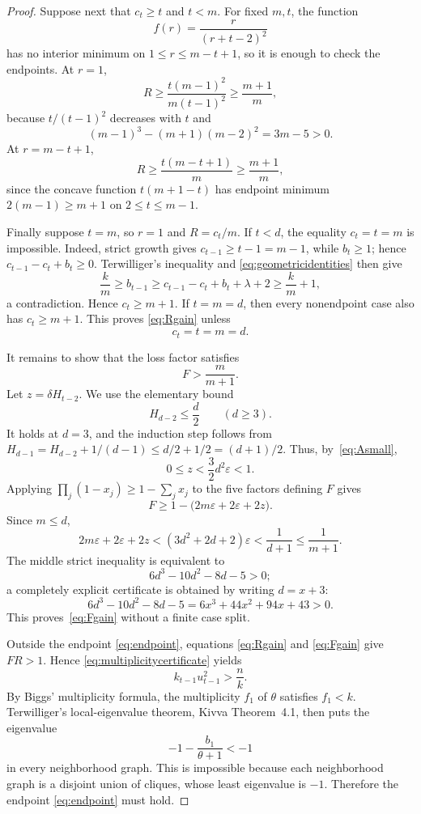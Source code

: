 \documentclass[11pt]{amsart}
\theoremstyle{definition}
\newcommand{\eps}{\varepsilon}
\begin{document}
\begin{proof}
Suppose next that $c_t\ge t$ and $t<m$.  For fixed $m,t$, the function
\[
  f(r)=\frac{r}{(r+t-2)^2}
\]
has no interior minimum on $1\le r\le m-t+1$, so it is enough to check the endpoints.  At $r=1$,
\[
  R\ge\frac{t(m-1)^2}{m(t-1)^2}\ge\frac{m+1}{m},
\]
because $t/(t-1)^2$ decreases with $t$ and
\[
  (m-1)^3-(m+1)(m-2)^2=3m-5>0.
\]
At $r=m-t+1$,
\[
  R\ge\frac{t(m-t+1)}{m}\ge\frac{m+1}{m},
\]
since the concave function $t(m+1-t)$ has endpoint minimum $2(m-1)\ge m+1$ on $2\le t\le m-1$.

Finally suppose $t=m$, so $r=1$ and $R=c_t/m$.  If $t<d$, the equality $c_t=t=m$ is impossible.  Indeed, strict growth gives $c_{t-1}\ge t-1=m-1$, while $b_t\ge1$; hence $c_{t-1}-c_t+b_t\ge0$.  Terwilliger's inequality and \eqref{eq:geometricidentities} then give
\[
  \frac{k}{m}\ge b_{t-1}
  \ge c_{t-1}-c_t+b_t+\lambda+2
  \ge\frac{k}{m}+1,
\]
a contradiction.  Hence $c_t\ge m+1$.  If $t=m=d$, then every nonendpoint case also has $c_t\ge m+1$.  This proves \eqref{eq:Rgain} unless
\begin{equation}\label{eq:endpoint}
  c_t=t=m=d.
\end{equation}

It remains to show that the loss factor satisfies
\begin{equation}\label{eq:Fgain}
  F>\frac{m}{m+1}.
\end{equation}
Let $z=\delta H_{t-2}$.  We use the elementary bound
\begin{equation}\label{eq:harmoniclinear}
  H_{d-2}\le\frac d2\qquad(d\ge3).
\end{equation}
It holds at $d=3$, and the induction step follows from
$H_{d-1}=H_{d-2}+1/(d-1)\le d/2+1/2=(d+1)/2$.
Thus, by~\eqref{eq:Asmall},
\[
  0\le z<\frac32d^2\eps<1.
\]
Applying $\prod_j(1-x_j)\ge1-\sum_jx_j$ to the five factors defining $F$ gives
\[
  F\ge1-\bigl(2m\eps+2\eps+2z\bigr).
\]
Since $m\le d$,
\[
  2m\eps+2\eps+2z
  <(3d^2+2d+2)\eps
  <\frac1{d+1}
  \le\frac1{m+1}.
\]
The middle strict inequality is equivalent to
\[
  6d^3-10d^2-8d-5>0;
\]
a completely explicit certificate is obtained by writing $d=x+3$:
\[
  6d^3-10d^2-8d-5=6x^3+44x^2+94x+43>0.
\]
This proves~\eqref{eq:Fgain} without a finite case split.

Outside the endpoint \eqref{eq:endpoint}, equations \eqref{eq:Rgain} and \eqref{eq:Fgain} give $FR>1$.  Hence \eqref{eq:multiplicitycertificate} yields
\[
  k_{t-1}u_{t-1}^2>\frac{n}{k}.
\]
By Biggs' multiplicity formula, the multiplicity $f_1$ of $\theta$ satisfies $f_1<k$.  Terwilliger's local-eigenvalue theorem, Kivva Theorem~4.1, then puts the eigenvalue
\[
  -1-\frac{b_1}{\theta+1}<-1
\]
in every neighborhood graph.  This is impossible because each neighborhood graph is a disjoint union of cliques, whose least eigenvalue is $-1$.  Therefore the endpoint \eqref{eq:endpoint} must hold.


\end{proof}
\end{document}
